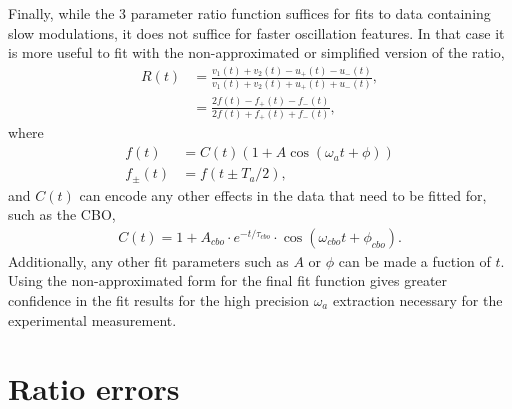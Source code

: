 Finally, while the 3 parameter ratio function suffices for fits to data containing slow modulations, it does not suffice for faster oscillation features. In that case it is more useful to fit with the non-approximated or simplified version of the ratio,
	\begin{equation}	
	\begin{aligned}
		R(t) &= \frac{v_{1}(t) + v_{2}(t) - u_{+}(t) - u_{-}(t)}{v_{1}(t) + v_{2}(t) + u_{+}(t) + u_{-}(t)}, \\ 
			 &= \frac{2f(t) - f_{+}(t) - f_{-}(t)}{2f(t) + f_{+}(t) + f_{-}(t)},
	\end{aligned}
	\end{equation}
where
	\begin{equation}	
	\begin{aligned}
		f(t) &= C(t) (1 + A \cos(\omega_{a}t + \phi)) \\ 
		f_{\pm}(t) &= f(t \pm T_{a}/2),
	\end{aligned}
	\end{equation}
and $C(t)$ can encode any other effects in the data that need to be fitted for, such as the CBO,
	\begin{align}
		C(t) = 1 + A_{cbo} \cdot e^{-t/\tau_{cbo}} \cdot \cos(\omega_{cbo}t + \phi_{cbo}).
	\end{align}
Additionally, any other fit parameters such as $A$ or $\phi$ can be made a fuction of $t$. Using the non-approximated form for the final fit function gives greater confidence in the fit results for the high precision $\omega_{a}$ extraction necessary for the experimental measurement.


\section{Ratio errors}


